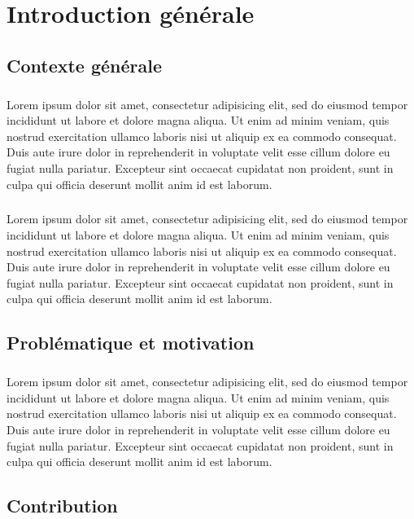 \chapter*{Introduction générale}
\lhead{}
\section*{Contexte générale}
\paragraph{}
Lorem ipsum dolor sit amet, consectetur adipisicing elit, sed do eiusmod
tempor incididunt ut labore et dolore magna aliqua. Ut enim ad minim veniam,
quis nostrud exercitation ullamco laboris nisi ut aliquip ex ea commodo
consequat. Duis aute irure dolor in reprehenderit in voluptate velit esse
cillum dolore eu fugiat nulla pariatur. Excepteur sint occaecat cupidatat non
proident, sunt in culpa qui officia deserunt mollit anim id est laborum.
\paragraph{}
Lorem ipsum dolor sit amet, consectetur adipisicing elit, sed do eiusmod
tempor incididunt ut labore et dolore magna aliqua. Ut enim ad minim veniam,
quis nostrud exercitation ullamco laboris nisi ut aliquip ex ea commodo
consequat. Duis aute irure dolor in reprehenderit in voluptate velit esse
cillum dolore eu fugiat nulla pariatur. Excepteur sint occaecat cupidatat non
proident, sunt in culpa qui officia deserunt mollit anim id est laborum.
\section*{Problématique et motivation}
\paragraph{}
Lorem ipsum dolor sit amet, consectetur adipisicing elit, sed do eiusmod
tempor incididunt ut labore et dolore magna aliqua. Ut enim ad minim veniam,
quis nostrud exercitation ullamco laboris nisi ut aliquip ex ea commodo
consequat. Duis aute irure dolor in reprehenderit in voluptate velit esse
cillum dolore eu fugiat nulla pariatur. Excepteur sint occaecat cupidatat non
proident, sunt in culpa qui officia deserunt mollit anim id est laborum.
\section*{Contribution }
